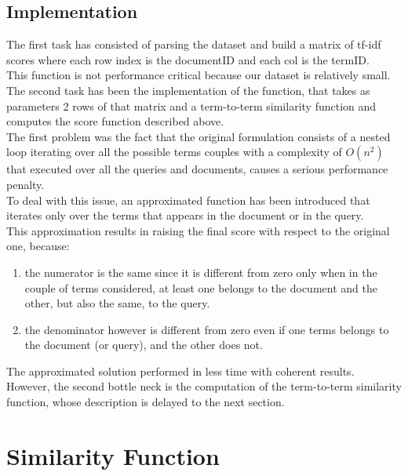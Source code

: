 \documentclass[twoside]{article}
\begin{document}
\subsection{Implementation}
The first task has consisted of parsing the dataset and build a matrix of tf-idf scores where each row index is the documentID and each col is the termID.\\This function is not performance critical because our dataset is relatively small.\\The second task has been the implementation of the function, that takes as parameters 2 rows of that matrix and a term-to-term similarity function and computes the score function described above.\\The first problem was the fact that the original formulation consists of a nested loop iterating over all the possible terms couples with a complexity of $O(n^2)$ that executed over all the queries and documents, causes a serious performance penalty.\\To deal with this issue, an approximated function has been introduced that iterates only over the terms that appears in the document or in the query.\\This approximation results in raising the final score with respect to the original one, because: 
\begin{enumerate}
\item the numerator is the same since it is different from zero only when in the couple of terms considered, at least one belongs to the document and the other, but also the same, to the query.
\item the denominator however is different from zero even if one terms belongs to the document (or query), and the other does not.
\end{enumerate}
The approximated solution performed in less time with coherent results.\\However, the second bottle neck is the computation of the term-to-term similarity function, whose description is delayed to the next section.

\section{Similarity Function}
\end{document}
